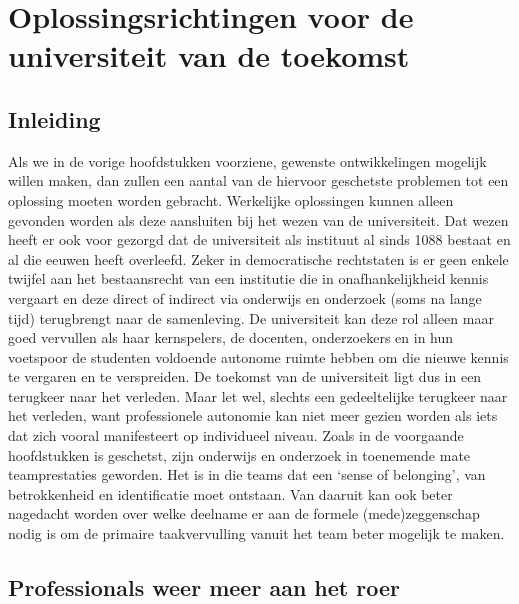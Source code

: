 \documentclass[empirical, authordate, ]{new-jote-article}
\begin{document}
	\section{Oplossingsrichtingen voor de universiteit van de toekomst}



	\subsection{Inleiding}



	Als we in de vorige hoofdstukken voorziene, gewenste ontwikkelingen mogelijk willen maken, dan zullen een aantal van de hiervoor geschetste problemen tot een oplossing moeten worden gebracht. Werkelijke oplossingen kunnen alleen gevonden worden als deze aansluiten bij het wezen van de universiteit. Dat wezen heeft er ook voor gezorgd dat de universiteit als instituut al sinds 1088 bestaat en al die eeuwen heeft overleefd. Zeker in democratische rechtstaten is er geen enkele twijfel aan het bestaansrecht van een institutie die in onafhankelijkheid kennis vergaart en deze direct of indirect via onderwijs en onderzoek (soms na lange tijd) terugbrengt naar de samenleving. De universiteit kan deze rol alleen maar goed vervullen als haar kernspelers, de docenten, onderzoekers en in hun voetspoor de studenten voldoende autonome ruimte hebben om die nieuwe kennis te vergaren en te verspreiden. De toekomst van de universiteit ligt dus in een terugkeer naar het verleden. Maar let wel, slechts een gedeeltelijke terugkeer naar het verleden, want professionele autonomie kan niet meer gezien worden als iets dat zich vooral manifesteert op individueel niveau. Zoals in de voorgaande hoofdstukken is geschetst, zijn onderwijs en onderzoek in toenemende mate teamprestaties geworden. Het is in die teams dat een ‘sense of belonging', van betrokkenheid en identificatie moet ontstaan. Van daaruit kan ook beter nagedacht worden over welke deelname er aan de formele (mede)zeggenschap nodig is om de primaire taakvervulling vanuit het team beter mogelijk te maken.



	\subsection{Professionals weer meer aan het roer}
\end{document}
